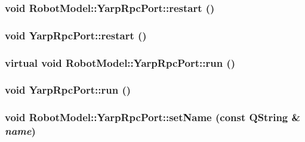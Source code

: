 \label{class_robot_model_1_1_yarp_rpc_port_a87e299eb43783a25cd71def0e50eb9dc}
\hypertarget{class_robot_model_1_1_yarp_rpc_port_ac72752818661170c795ed1c4c10dcac2}{
\subsubsection[{restart}]{\setlength{\rightskip}{0pt plus 5cm}void RobotModel::YarpRpcPort::restart ()}}
\label{class_robot_model_1_1_yarp_rpc_port_ac72752818661170c795ed1c4c10dcac2}
\hypertarget{class_robot_model_1_1_yarp_rpc_port_a93d242e15bb04534f7db4fe6636a0086}{
\subsubsection[{restart}]{\setlength{\rightskip}{0pt plus 5cm}void YarpRpcPort::restart ()}}
\label{class_robot_model_1_1_yarp_rpc_port_a93d242e15bb04534f7db4fe6636a0086}
\hypertarget{class_robot_model_1_1_yarp_rpc_port_a1d70c28615104cd25ce2d2e7b61a592c}{
\subsubsection[{run}]{\setlength{\rightskip}{0pt plus 5cm}virtual void RobotModel::YarpRpcPort::run ()}}
\label{class_robot_model_1_1_yarp_rpc_port_a1d70c28615104cd25ce2d2e7b61a592c}
\hypertarget{class_robot_model_1_1_yarp_rpc_port_a3e4c1be7ae685d9478b38d71255b1bcd}{
\subsubsection[{run}]{\setlength{\rightskip}{0pt plus 5cm}void YarpRpcPort::run ()}}
\label{class_robot_model_1_1_yarp_rpc_port_a3e4c1be7ae685d9478b38d71255b1bcd}
\hypertarget{class_robot_model_1_1_yarp_rpc_port_aa30cabbf5681b128766ad8556c33cd65}{
\subsubsection[{setName}]{\setlength{\rightskip}{0pt plus 5cm}void RobotModel::YarpRpcPort::setName (const QString \& {\em name})}}
